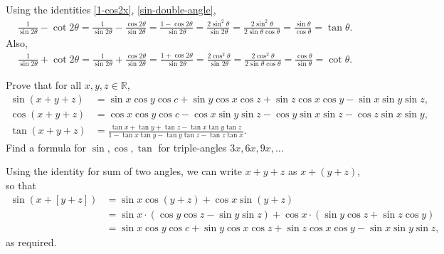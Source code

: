 \begin{solution}[name=($\cot x-\cot 2x$) Exercise Identity]
Using the identities \eqref{1-cos2x}, \eqref{sin-double-angle},
    \begin{align*}
        \frac{1}{\sin 2\theta} - \cot 2\theta  = \frac{1}{\sin 2\theta} - \frac{\cos 2\theta }{\sin 2\theta} = \frac{1 - \cos 2\theta}{\sin 2\theta} = \frac{2\sin^2 \theta}{\sin 2\theta} = \frac{2\sin^2 \theta}{2\sin \theta \cos \theta } = \frac{\sin \theta}{\cos \theta}= \tan \theta. 
    \end{align*}
Also,
    \begin{align*}
        \frac{1}{\sin 2\theta} + \cot 2\theta  = \frac{1}{\sin 2\theta} + \frac{\cos 2\theta }{\sin 2\theta} = \frac{1+\cos 2\theta}{\sin 2\theta} = \frac{2\cos^2 \theta}{\sin 2\theta} = \frac{2\cos^2 \theta}{2\sin \theta \cos \theta } = \frac{\cos \theta}{\sin \theta}= \cot \theta.
    \end{align*}
\end{solution}



\begin{tcolorbox}
    \begin{question}[name=Sum of Three Angles Identity]
    Prove that for all $x,y,z \in \mathbb R$,
    \begin{align}
        \sin(x+y+z) &= \sin x \cos y \cos c + \sin y \cos x \cos z + \sin z \cos x \cos y - \sin x \sin y \sin z, \label{id:sin-sum-of-three-angles} \\
        \cos(x+y+z) &= \cos x \cos y \cos c - \cos x \sin y \sin z - \cos y \sin x \sin z - \cos z \sin x \sin y, \label{id:cos-sum-of-three-angles} \\
        \tan(x+y+z) &= \frac{\tan x + \tan y + \tan z - \tan x \tan y \tan z}{1 - \tan x \tan y - \tan y \tan z - \tan z \tan x}. \label{id:tan-sum-of-three-angles}
    \end{align}
    Find a formula for $\sin, \cos, \tan$ for triple-angles $3x, 6x, 9x, \dots$
\end{question}
\end{tcolorbox}

\begin{solution}[name=Proof of Sum of Three Angles Identity]
Using the identity for sum of two angles, we can write $x+y+z$ as $x+(y+z)$, so that
\begin{align*}
    \sin(x+[y+z]) &=\sin x \cos(y+z) + \cos x \sin(y+z)\\
    &= \sin x \cdot \left(\cos y\cos z - \sin y \sin z\right) + \cos x \cdot \left(\sin y \cos z + \sin z \cos y\right)\\
    &= \sin x \cos y \cos c + \sin y \cos x \cos z + \sin z \cos x \cos y - \sin x \sin y \sin z,
\end{align*}
as required.
\end{solution}

